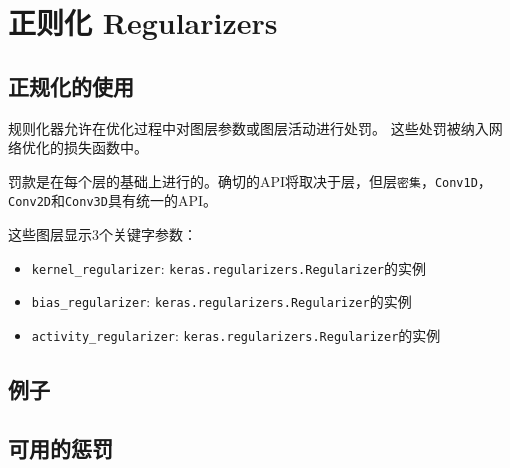 \section{正则化 Regularizers}\label{regularizers}
\subsection{正规化的使用}

规则化器允许在优化过程中对图层参数或图层活动进行处罚。
这些处罚被纳入网络优化的损失函数中。

罚款是在每个层的基础上进行的。确切的API将取决于层，但层\texttt{密集}，\texttt{Conv1D}，\texttt{Conv2D}和\texttt{Conv3D}具有统一的API。

这些图层显示3个关键字参数：

\begin{itemize}
\tightlist
\item
  \texttt{kernel\_regularizer}:
  \texttt{keras.regularizers.Regularizer}的实例
\item
  \texttt{bias\_regularizer}:
  \texttt{keras.regularizers.Regularizer}的实例
\item
  \texttt{activity\_regularizer}:
  \texttt{keras.regularizers.Regularizer}的实例
\end{itemize}

\subsection{例子}\label{ux4f8bux5b50}

\begin{Shaded}
\begin{Highlighting}[]
  
\OperatorTok{=}\NormalTok{,}
                \OperatorTok{=}\NormalTok{),}
                \OperatorTok{=}\NormalTok{)))}
\end{Highlighting}
\end{Shaded}

\subsection{可用的惩罚}\label{ux53efux7528ux7684ux60e9ux7f5a}

\begin{Shaded}
\begin{Highlighting}[]
\end{Highlighting}
\end{Shaded}

